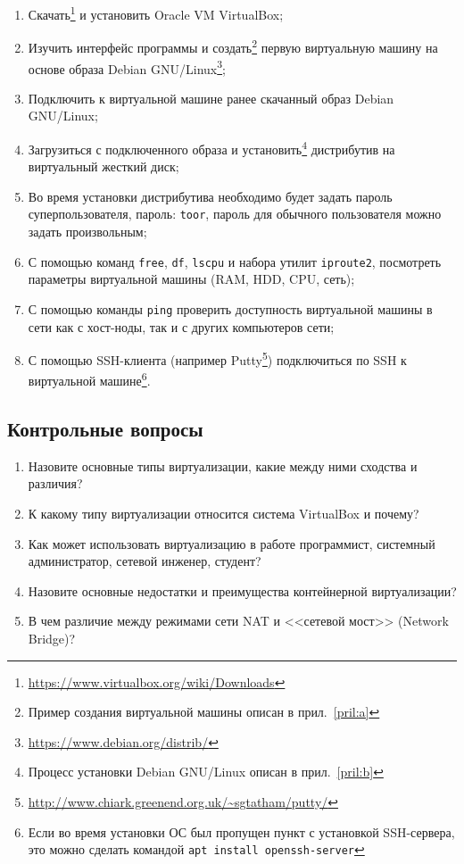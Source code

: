 \begin{enumerate}
    \item Скачать\footnote{\url{https://www.virtualbox.org/wiki/Downloads}} и установить Oracle VM VirtualBox;
    \item Изучить интерфейс программы и создать\footnote{Пример создания виртуальной машины описан в прил.~\ref{pril:a}} первую виртуальную машину на основе образа Debian GNU/Linux\footnote{\url{https://www.debian.org/distrib/}};
    \item Подключить к виртуальной машине ранее скачанный образ Debian GNU/Linux;
    \item Загрузиться с подключенного образа и установить\footnote{Процесс установки Debian GNU/Linux описан в прил.~\ref{pril:b}} дистрибутив на виртуальный жесткий диск;
    \item Во время установки дистрибутива необходимо будет задать пароль суперпользователя, пароль: \texttt{toor}, пароль для обычного пользователя можно задать произвольным;
    \item С помощью команд \texttt{free}, \texttt{df}, \texttt{lscpu} и набора утилит \texttt{iproute2}, посмотреть параметры виртуальной машины (RAM, HDD, CPU, сеть);
    \item С помощью команды \texttt{ping} проверить доступность виртуальной машины в сети как с хост-ноды, так и с других компьютеров сети;
    \item С помощью SSH-клиента (например Putty\footnote{\url{http://www.chiark.greenend.org.uk/~sgtatham/putty/}}) подключиться по SSH к виртуальной машине\footnote{Если во время установки ОС был пропущен пункт с установкой SSH-сервера, это можно сделать командой \texttt{apt install openssh-server}}.
\end{enumerate}

\subsection{Контрольные вопросы}
\begin{enumerate}
    \item Назовите основные типы виртуализации, какие между ними сходства и различия?
    \item К какому типу виртуализации относится система VirtualBox и почему?
    \item Как может использовать виртуализацию в работе программист, системный администратор, сетевой инженер, студент?
    \item Назовите основные недостатки и преимущества контейнерной виртуализации?
    \item В чем различие между режимами сети NAT и <<сетевой мост>> (Network Bridge)?
\end{enumerate}

\clearpage
